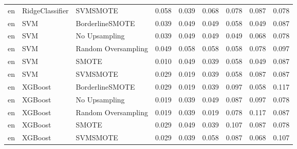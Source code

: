 \begin{tabular}{lllllllll}
      en &              RidgeClassifier &            SVMSMOTE & 0.058 &                     0.039 &                 0.068 &                  0.078 &                                   0.087 &     0.078 \\
      en &                          SVM &     BorderlineSMOTE & 0.039 &                     0.049 &                 0.049 &                  0.058 &                                   0.049 &     0.087 \\
      en &                          SVM &       No Upsampling & 0.039 &                     0.049 &                 0.049 &                  0.049 &                                   0.068 &     0.078 \\
      en &                          SVM & Random Oversampling & 0.049 &                     0.058 &                 0.058 &                  0.058 &                                   0.078 &     0.097 \\
      en &                          SVM &               SMOTE & 0.010 &                     0.049 &                 0.039 &                  0.058 &                                   0.049 &     0.087 \\
      en &                          SVM &            SVMSMOTE & 0.029 &                     0.019 &                 0.039 &                  0.058 &                                   0.087 &     0.087 \\
      en &                      XGBoost &     BorderlineSMOTE & 0.029 &                     0.019 &                 0.039 &                  0.097 &                                   0.058 &     0.117 \\
      en &                      XGBoost &       No Upsampling & 0.019 &                     0.039 &                 0.049 &                  0.087 &                                   0.097 &     0.078 \\
      en &                      XGBoost & Random Oversampling & 0.019 &                     0.039 &                 0.019 &                  0.078 &                                   0.117 &     0.087 \\
      en &                      XGBoost &               SMOTE & 0.029 &                     0.049 &                 0.039 &                  0.107 &                                   0.087 &     0.078 \\
      en &                      XGBoost &            SVMSMOTE & 0.029 &                     0.039 &                 0.058 &                  0.087 &                                   0.068 &     0.107 \\

\end{tabular}
